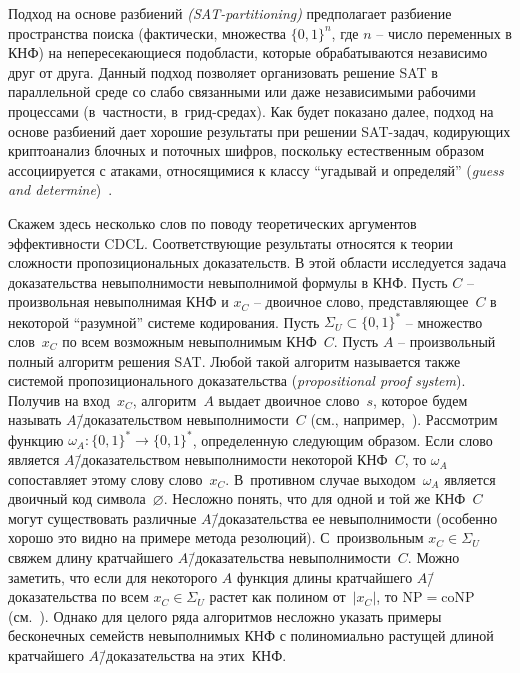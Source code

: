 Подход на основе разбиений \textit{(SAT-partitioning)} предполагает разбиение пространства поиска (фактически, множества $\{ 0,1 \}^{n}$, где $n$ \--- число переменных в КНФ) на непересекающиеся подобласти, которые обрабатываются независимо друг от друга.
Данный подход позволяет организовать решение SAT в параллельной среде со слабо связанными или даже независимыми рабочими процессами (в~частности, в~грид-средах).
Как будет показано далее, подход на основе разбиений дает хорошие результаты при решении SAT-задач, кодирующих криптоанализ блочных и поточных шифров, поскольку естественным образом ассоциируется с атаками, относящимися к классу \enquote{угадывай и определяй} (\textit{guess and determine})~\cite{bard2009}.

Скажем здесь несколько слов по поводу теоретических аргументов эффективности CDCL.
Соответствующие результаты относятся к теории сложности пропозициональных доказательств.
В этой области исследуется задача доказательства невыполнимости невыполнимой формулы в КНФ.
Пусть $C$ \--- произвольная невыполнимая КНФ и $x_{C}$ \--- двоичное слово, представляющее~$C$ в некоторой \enquote{разумной} системе кодирования.
Пусть $\Sigma_{U} \subset \{ 0,1 \}^{*}$ \--- множество слов~$x_{C}$ по всем возможным невыполнимым КНФ~$C$.
Пусть $A$ \--- произвольный полный алгоритм решения SAT.
Любой такой алгоритм называется также системой пропозиционального доказательства (\textit{propositional proof system}).
Получив на вход~$x_{C}$, алгоритм~$A$ выдает двоичное слово~$s$, которое будем называть $A$\=/доказательством невыполнимости~$C$ (см., например,~\cite{razborov2002}).
Рассмотрим функцию $\omega_{A} \colon \{ 0,1 \}^{*} \to \{ 0,1 \}^{*}$, определенную следующим образом.
Если слово является $A$\=/доказательством невыполнимости некоторой КНФ~$C$, то $\omega_{A}$ сопоставляет этому слову слово~$x_{C}$.
В~противном случае выходом~$\omega_{A}$ является двоичный код символа~$\varnothing$.
Несложно понять, что для одной и той же КНФ~$C$ могут существовать различные $A$\=/доказательства ее невыполнимости (особенно хорошо это видно на примере метода резолюций).
С~произвольным $x_{C} \in \Sigma_{U}$ свяжем длину кратчайшего $A$\=/доказательства невыполнимости~$C$.
Можно заметить, что если для некоторого $A$ функция длины кратчайшего $A$\=/доказательства по всем $x_{C} \in \Sigma_{U}$ растет как полином от~$|x_{C}|$, то $\mathrm{NP} = \mathrm{coNP}$ (см.~\cite{cook1979}).
Однако для целого ряда алгоритмов несложно указать примеры бесконечных семейств невыполнимых КНФ с полиномиально растущей длиной кратчайшего $A$\=/доказательства на этих~КНФ.

